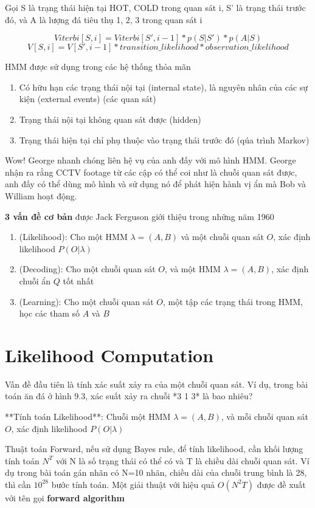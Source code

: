 Gọi S là trạng thái hiện tại {HOT, COLD} trong quan sát i, S' là trạng thái trước đó, và A là lượng đá tiêu thụ {1, 2, 3} trong quan sát i

$$Viterbi[S,i] = Viterbi[S', i-1] * p(S|S') * p(A|S)$$
$$V[S,i] = V[S',i-1] * transition\_likelihood * observation\_likelihood$$

HMM được sử dụng trong các hệ thống thỏa mãn

\begin{enumerate}
  \item Có hữu hạn các trạng thái nội tại (internal state), là nguyên nhân của các sự kiện (external events) (các quan sát)
  \item Trạng thái nội tại không quan sát được (hidden)
  \item Trạng thái hiện tại chỉ phụ thuộc vào trạng thái trước đó (qúa trình Markov)
\end{enumerate}

Wow! George nhanh chóng liên hệ vụ của anh đấy với mô hình HMM. George nhận ra rằng CCTV footage từ các cập có thể coi như là chuỗi quan sát được, anh đấy có thể dùng mô hình và sử dụng nó để phát hiện hành vị ẩn mà Bob và William hoạt động.

\textbf{3 vấn đề cơ bản} được Jack Ferguson giới thiệu trong những năm 1960

\begin{enumerate}
  \item (Likelihood): Cho một HMM $\lambda = (A, B)$ và một chuỗi quan sát $O$, xác định likelihood $P(O|\lambda)$
  \item (Decoding): Cho một chuỗi quan sát $O$, và một HMM $\lambda = (A,B)$, xác định chuỗi ẩn $Q$ tốt nhất
  \item (Learning): Cho một chuỗi quan sát $O$, một tập các trạng thái trong HMM, học các tham số $A$ và $B$
\end{enumerate}

\section{Likelihood Computation}

Vấn đề đầu tiên là tính xác suất xảy ra của một chuỗi quan sát. Ví dụ, trong bài toán ăn đá ở hình 9.3, xác suất xảy ra chuỗi *3 1 3* là bao nhiêu?

**Tính toán Likelihood**: Chuỗi một HMM $\lambda = (A, B)$, và mỗi chuỗi quan sát $O$, xác định likelihood $P(O|\lambda)$

Thuật toán Forward, nếu sử dụng Bayes rule, để tính likelihood, cần khối lượng tính toán $N^T$ với N là số trạng thái có thể có và T là chiều dài chuỗi quan sát. Ví dụ trong bài toán gán nhãn có N=10 nhãn, chiều dài của chuỗi trung bình là 28, thì cần $10^{28}$ bước tính toán. Một giải thuật với hiệu quả $O(N^2T)$ được đề xuất với tên gọi \textbf{forward algorithm}

